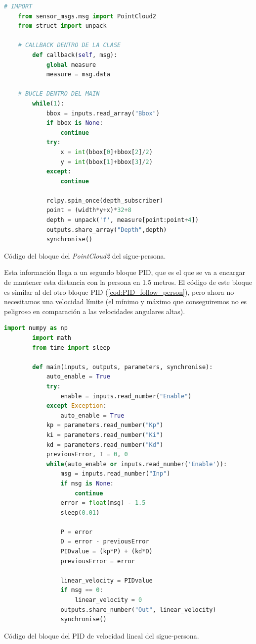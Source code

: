 \begin{code}[H]
    \begin{lstlisting}[language=python]
    # IMPORT
    from sensor_msgs.msg import PointCloud2
    from struct import unpack

    # CALLBACK DENTRO DE LA CLASE
        def callback(self, msg):
            global measure
            measure = msg.data

    # BUCLE DENTRO DEL MAIN
        while(1):
            bbox = inputs.read_array("Bbox")
            if bbox is None:
                continue
            try:
                x = int(bbox[0]+bbox[2]/2)
                y = int(bbox[1]+bbox[3]/2)
            except:
                continue

            rclpy.spin_once(depth_subscriber)
            point = (width*y+x)*32+8
            depth = unpack('f', measure[point:point+4])
            outputs.share_array("Depth",depth)   
            synchronise()
    \end{lstlisting}
    \caption[Código bloque Camera-Depth sigue-persona]{Código del bloque del \textit{PointCloud2} del sigue-persona.}
    \label{cod:PC2_block_FP}
\end{code}

Esta información llega a un segundo bloque PID, que es el que se va a encargar de mantener esta distancia con la persona en 1.5 metros. El código de este bloque
es similar al del otro bloque PID (\ref{cod:PID_follow_person}), pero ahora no necesitamos una velocidad límite (el mínimo y máximo que conseguiremos no es peligroso
en comparación a las velocidades angulares altas).

\begin{code}[H]
    \begin{lstlisting}[language=python]
        import numpy as np
        import math
        from time import sleep
        
        def main(inputs, outputs, parameters, synchronise):
            auto_enable = True
            try:
                enable = inputs.read_number("Enable")
            except Exception:
                auto_enable = True
            kp = parameters.read_number("Kp")
            ki = parameters.read_number("Ki")
            kd = parameters.read_number("Kd")
            previousError, I = 0, 0
            while(auto_enable or inputs.read_number('Enable')):
                msg = inputs.read_number("Inp")
                if msg is None:
                    continue
                error = float(msg) - 1.5
                sleep(0.01)
        
                P = error
                D = error - previousError
                PIDvalue = (kp*P) + (kd*D)
                previousError = error
    
                linear_velocity = PIDvalue
                if msg == 0:
                    linear_velocity = 0
                outputs.share_number("Out", linear_velocity)
                synchronise()
    \end{lstlisting}
    \caption[Código bloque PID lineal sigue-persona]{Código del bloque del PID de velocidad lineal del sigue-persona.}
    \label{cod:PID_linear_FP}
\end{code}

